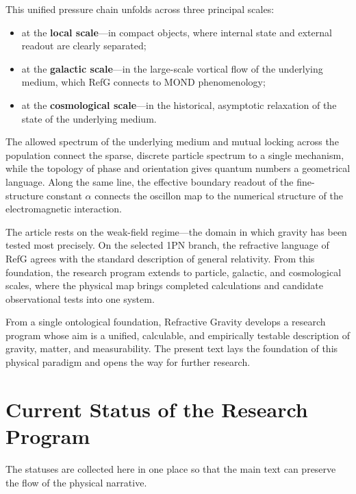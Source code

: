 \documentclass[11pt,a4paper]{article}
\begin{document}
This unified pressure chain unfolds across three principal scales:

\begin{itemize}
\item at the \textbf{local scale}---in compact objects, where internal state and external readout are clearly separated;
\item at the \textbf{galactic scale}---in the large-scale vortical flow of the underlying medium, which RefG connects to MOND phenomenology;
\item at the \textbf{cosmological scale}---in the historical, asymptotic relaxation of the state of the underlying medium.
\end{itemize}

The allowed spectrum of the underlying medium and mutual locking across the population connect the sparse, discrete particle spectrum to a single mechanism, while the topology of phase and orientation gives quantum numbers a geometrical language. Along the same line, the effective boundary readout of the fine-structure constant $\alpha$ connects the oscillon map to the numerical structure of the electromagnetic interaction.

The article rests on the weak-field regime---the domain in which gravity has been tested most precisely. On the selected 1PN branch, the refractive language of RefG agrees with the standard description of general relativity. From this foundation, the research program extends to particle, galactic, and cosmological scales, where the physical map brings completed calculations and candidate observational tests into one system.

From a single ontological foundation, Refractive Gravity develops a research program whose aim is a unified, calculable, and empirically testable description of gravity, matter, and measurability. The present text lays the foundation of this physical paradigm and opens the way for further research.

\section*{Current Status of the Research Program}

The statuses are collected here in one place so that the main text can preserve the flow of the physical narrative.
\end{document}
